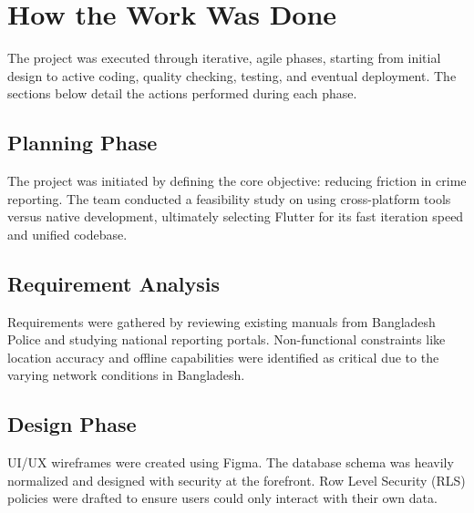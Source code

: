 \documentclass[12pt, a4paper, twoside]{report}
\begin{document}
\section{How the Work Was Done}
The project was executed through iterative, agile phases, starting from initial design to active coding, quality checking, testing, and eventual deployment. The sections below detail the actions performed during each phase.

\subsection{Planning Phase}
The project was initiated by defining the core objective: reducing friction in crime reporting. The team conducted a feasibility study on using cross-platform tools versus native development, ultimately selecting Flutter for its fast iteration speed and unified codebase.

\subsection{Requirement Analysis}
Requirements were gathered by reviewing existing manuals from Bangladesh Police and studying national reporting portals. Non-functional constraints like location accuracy and offline capabilities were identified as critical due to the varying network conditions in Bangladesh.

\subsection{Design Phase}
UI/UX wireframes were created using Figma. The database schema was heavily normalized and designed with security at the forefront. Row Level Security (RLS) policies were drafted to ensure users could only interact with their own data.
\end{document}
